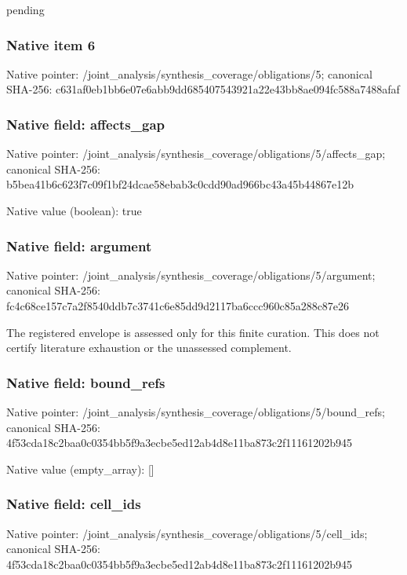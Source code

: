 \documentclass[10pt,a4paper]{article}
\begin{document}
\begingroup\raggedright\sloppy pending\par\endgroup

\subsubsection{Native item 6}
Native pointer: /joint\_\allowbreak{}analysis/synthesis\_\allowbreak{}coverage/obligations/5; canonical SHA-256: c631af0eb1bb6e07e6abb9dd685407543921a22e43bb8ae094fc588a7488afaf

\subsubsection{Native field: affects\_\allowbreak{}gap}
Native pointer: /joint\_\allowbreak{}analysis/synthesis\_\allowbreak{}coverage/obligations/5/affects\_\allowbreak{}gap; canonical SHA-256: b5bea41b6c623f7c09f1bf24dcae58ebab3c0cdd90ad966bc43a45b44867e12b

Native value (boolean): true

\subsubsection{Native field: argument}
Native pointer: /joint\_\allowbreak{}analysis/synthesis\_\allowbreak{}coverage/obligations/5/argument; canonical SHA-256: fc4c68ce157c7a2f8540ddb7c3741c6e85dd9d2117ba6ccc960c85a288c87e26

\begingroup\raggedright\sloppy The registered envelope is assessed only for this finite curation. This does not certify literature exhaustion or the unassessed complement.\par\endgroup

\subsubsection{Native field: bound\_\allowbreak{}refs}
Native pointer: /joint\_\allowbreak{}analysis/synthesis\_\allowbreak{}coverage/obligations/5/bound\_\allowbreak{}refs; canonical SHA-256: 4f53cda18c2baa0c0354bb5f9a3ecbe5ed12ab4d8e11ba873c2f11161202b945

Native value (empty\_\allowbreak{}array): []

\subsubsection{Native field: cell\_\allowbreak{}ids}
Native pointer: /joint\_\allowbreak{}analysis/synthesis\_\allowbreak{}coverage/obligations/5/cell\_\allowbreak{}ids; canonical SHA-256: 4f53cda18c2baa0c0354bb5f9a3ecbe5ed12ab4d8e11ba873c2f11161202b945
\end{document}
